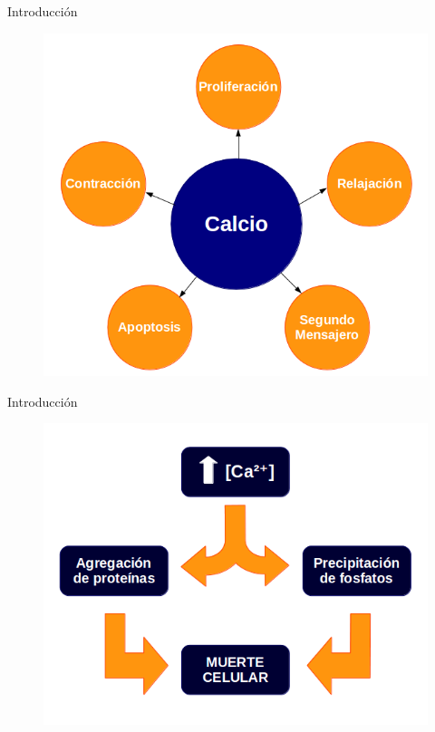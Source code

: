 \begin{frame}{Introducción}

\begin{figure}[h]
	\includegraphics[width=.8\textwidth]{Calcio}
\end{figure}
  
\end{frame}

\begin{frame}{Introducción}

\begin{figure}[h]
	\includegraphics[width=.9\textwidth]{Toxicidad}
\end{figure}

\end{frame}

